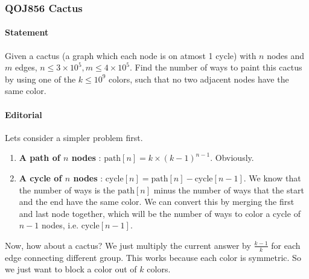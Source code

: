 \subsubsection{QOJ856 Cactus}


\paragraph{Statement}
Given a cactus (a graph which each node is on atmost 1 cycle) with $n$ nodes and $m$ edges, $n \le 3\times10^5, m \le 4\times10^5$.
Find the number of ways to paint this cactus by using one of the $k \le 10^9$ colors, such that no two adjacent nodes have the same color.

\paragraph{Editorial}
Lets consider a simpler problem first.
\begin{enumerate}
    \item \textbf{A path of $n$ nodes} : $\text{path}[n] = k \times (k-1)^{n-1}$. Obviously.
    \item \textbf{A cycle of $n$ nodes} : $\text{cycle}[n] = \text{path}[n] - \text{cycle}[n-1]$.
    We know that the number of ways is the $\text{path}[n]$ minus the number of ways that the start and the end have the same color.
    We can convert this by merging the first and last node together, which will be the number of ways to color a cycle of $n-1$ nodes, i.e. $\text{cycle}[n-1]$.
\end{enumerate}

Now, how about a cactus? We just multiply the current answer by $\frac{k-1}{k}$ for each edge connecting different group.
This works because each color is symmetric.
So we just want to block a color out of $k$ colors.

